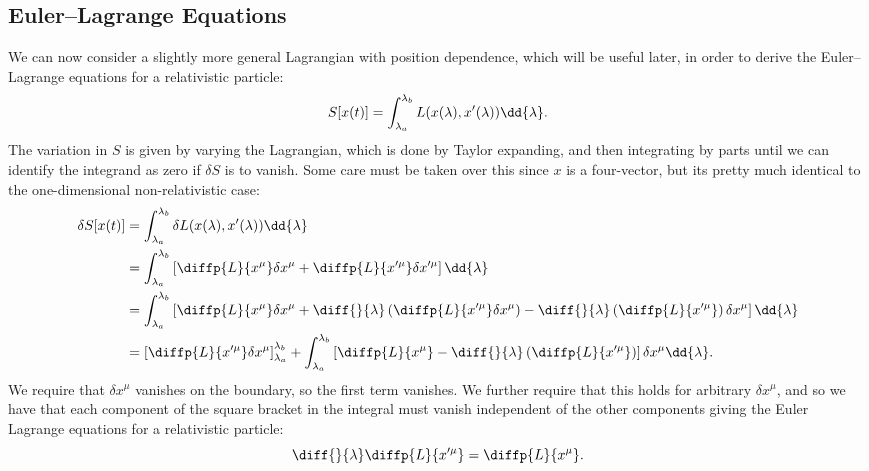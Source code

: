 \subsection{Euler--Lagrange Equations}
We can now consider a slightly more general Lagrangian with position dependence, which will be useful later, in order to derive the Euler--Lagrange equations for a relativistic particle:
\begin{equation}
    S[x(t)] = \int_{\lambda_a}^{\lambda_b} \lagrangian(x(\lambda), x'(\lambda)) \dd{\lambda}.
\end{equation}
The variation in \(S\) is given by varying the Lagrangian, which is done by Taylor expanding, and then integrating by parts until we can identify the integrand as zero if \(\delta S\) is to vanish.
Some care must be taken over this since \(x\) is a four-vector, but its pretty much identical to the one-dimensional non-relativistic case:
\begin{align}
    \delta S[x(t)] &= \int_{\lambda_a}^{\lambda_b} \delta \lagrangian(x(\lambda), x'(\lambda)) \dd{\lambda}\\
    &= \int_{\lambda_a}^{\lambda_b} \left[ \diffp{\lagrangian}{x^\mu}\delta x^\mu + \diffp{\lagrangian}{x'^\mu} \delta x'^\mu \right] \dd{\lambda}\\
    &= \int_{\lambda_a}^{\lambda_b} \left[ \diffp{\lagrangian}{x^\mu} \delta x^\mu + \diff{}{\lambda}\left( \diffp{\lagrangian}{x'^\mu} \delta x^\mu \right) - \diff{}{\lambda}\left( \diffp{\lagrangian}{x'^\mu} \right) \delta x^\mu \right]\dd{\lambda}\\
    &= \left[ \diffp{\lagrangian}{x'^\mu} \delta x^\mu \right]_{\lambda_a}^{\lambda_b} + \int_{\lambda_a}^{\lambda_b} \left[ \diffp{\lagrangian}{x^\mu} - \diff{}{\lambda}\left( \diffp{\lagrangian}{x'^\mu} \right) \right] \delta x^\mu \dd{\lambda}.
\end{align}
We require that \(\delta x^\mu\) vanishes on the boundary, so the first term vanishes.
We further require that this holds for arbitrary \(\delta x^\mu\), and so we have that each component of the square bracket in the integral must vanish independent of the other components giving the Euler Lagrange equations for a relativistic particle:
\begin{equation}
    \diff{}{\lambda}\diffp{\lagrangian}{x'^\mu} = \diffp{\lagrangian}{x^\mu}.
\end{equation}

